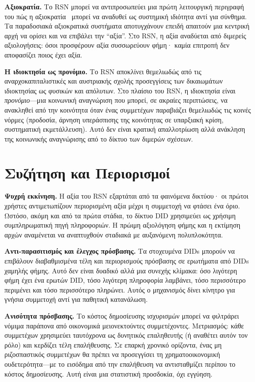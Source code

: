 \documentclass[11pt,a4paper,twocolumn]{article}
\begin{document}
\textbf{Αξιοκρατία.} Το RSN μπορεί να αντιπροσωπεύει μια πρώτη λειτουργική περιγραφή του πώς η αξιοκρατία~\cite{young1958} μπορεί να αναδυθεί ως συστημική ιδιότητα αντί για σύνθημα. Τα παραδοσιακά αξιοκρατικά συστήματα αποτυγχάνουν επειδή απαιτούν μια κεντρική αρχή να ορίσει και να επιβάλει την ``αξία''. Στο RSN, η αξία αναδύεται από διμερείς αξιολογήσεις: όσοι προσφέρουν αξία συσσωρεύουν φήμη· καμία επιτροπή δεν αποφασίζει ποιος έχει αξία.

\textbf{Η ιδιοκτησία ως προνόμιο.} Το RSN αποκλίνει θεμελιωδώς από τις αναρχοκαπιταλιστικές και αυστριακής σχολής προσεγγίσεις των δικαιωμάτων ιδιοκτησίας ως φυσικών και απόλυτων. Στο πλαίσιο του RSN, η ιδιοκτησία είναι \emph{προνόμιο}---μια κοινωνική αναγνώριση που μπορεί, σε ακραίες περιπτώσεις, να ανακληθεί από την κοινότητα όταν ένας συμμετέχων παραβιάζει θεμελιωδώς τις κοινές νόρμες (προδοσία, άρνηση υπεράσπισης της κοινότητας σε υπαρξιακή κρίση, συστηματική εκμετάλλευση). Αυτό δεν είναι κρατική απαλλοτρίωση αλλά ανάκληση της κοινωνικής αναγνώρισης από το δίκτυο των διμερών σχέσεων.

\section{Συζήτηση και Περιορισμοί}

\textbf{Ψυχρή εκκίνηση.} Η αξία του RSN εξαρτάται από τα φαινόμενα δικτύου· οι πρώτοι χρήστες αντιμετωπίζουν περιορισμένη αξία μέχρι η συμμετοχή να φτάσει ένα όριο. Ωστόσο, ακόμη και από τα πρώτα στάδια, το δίκτυο DID χρησιμεύει ως χρήσιμη συμπληρωματική πηγή πληροφοριών. Η πρώιμη αξιολόγηση φήμης και η εκτίμηση αρχών αναμένεται να αναπτυχθούν σταδιακά με αυξανόμενη πολυπλοκότητα.

\textbf{Αντι-παρασιτισμός και έλεγχος πρόσβασης.} Τα στοχευμένα DIDs μπορούν να επιβάλουν διαβαθμισμένα τέλη και περιορισμούς πρόσβασης σε ερωτήματα από DIDs χαμηλής φήμης. Αυτό δεν είναι δυαδικό αλλά μια συνεχής κλίμακα: όσο λιγότερη φήμη έχει ένα ερωτών DID, τόσο λιγότερη πληροφορία λαμβάνει, τόσο περισσότερο περιμένει και τόσο περισσότερο πληρώνει. Αυτός ο μηχανισμός δίνει κίνητρο για γνήσια συμμετοχή αντί για παθητική κατανάλωση.

\textbf{Ανισότητα πρόσβασης.} Το κόστος δημοσίευσης ισχυρισμών μπορεί να φιλτράρει νόμιμα παράπονα από οικονομικά μειονεκτούντες συμμετέχοντες. Μετριασμός: κάθε συμμετέχων χρησιμεύει ταυτόχρονα ως δυνητικός επαληθευτής (ή αναθέτει αυτόν τον ρόλο) και κερδίζει τέλη επαλήθευσης. Σε επαρκή χρονικό ορίζοντα, ένας μη ριζοσπαστικός συμμετέχων θα πρέπει να προσεγγίσει τη χρηματοοικονομική ουδετερότητα---με το εισόδημα από την επαλήθευση να αντισταθμίζει περίπου το κόστος δημοσίευσης. Αυτή είναι μια στατιστική προσδοκία, όχι εγγύηση.
\end{document}
